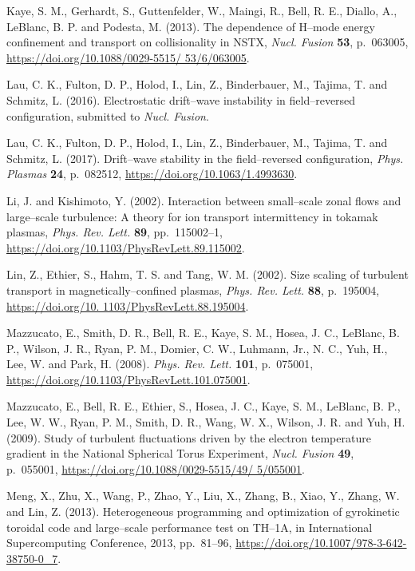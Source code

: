 \documentclass[a4paper,openany,12pt]{book}
\begin{document}
\begin{thebibliography}{100}
\bibitem{}
Kaye, S. M., Gerhardt, S., Guttenfelder, W., Maingi, R., Bell, R. E., Diallo, A., LeBlanc, B. P. and Podesta, M. (2013). The dependence of H--mode energy confinement and transport on collisionality in NSTX, \emph{Nucl. Fusion} 
\textbf{53}, p.~063005, \url{https://doi.org/10.1088/0029-5515/ 53/6/063005}.

\bibitem{}
Lau, C. K., Fulton, D. P., Holod, I., Lin, Z., Binderbauer, M., Tajima, T. and Schmitz, L. (2016).  Electrostatic drift--wave instability in field--reversed configuration, submitted to \emph{Nucl. Fusion}. 

\bibitem{}
Lau, C. K., Fulton, D. P., Holod, I., Lin, Z., Binderbauer, M., Tajima, T. and Schmitz, L. (2017). Drift--wave stability in the field--reversed configuration, \emph{Phys. Plasmas} \textbf{24}, p.~082512,
\url{https://doi.org/10.1063/1.4993630}.

\bibitem{}
Li, J. and Kishimoto, Y. (2002). Interaction between small--scale zonal flows and large--scale turbulence: A theory for ion transport intermittency in tokamak plasmas, \emph{Phys. Rev. Lett.} \textbf{89}, pp.~115002--1, 
\url{https://doi.org/10.1103/PhysRevLett.89.115002}.

\bibitem{}
Lin, Z., Ethier, S., Hahm, T. S. and Tang, W. M. (2002). Size scaling of turbulent transport in magnetically--confined plasmas, \emph{Phys. Rev. Lett.} \textbf{88}, p.~195004, \url{https://doi.org/10. 1103/PhysRevLett.88.195004}.

\bibitem{}
Mazzucato, E., Smith, D. R., Bell, R. E., Kaye, S. M., Hosea, J. C., LeBlanc, B. P., Wilson, J. R., Ryan, P. M., Domier, C. W., Luhmann, Jr., N. C., Yuh, H., Lee, W. and Park, H. (2008). \emph{Phys. Rev. Lett.} \textbf{101}, p.~075001, 
\url{https://doi.org/10.1103/PhysRevLett.101.075001}.

\bibitem{}
Mazzucato, E., Bell, R. E., Ethier, S., Hosea, J. C., Kaye, S. M., LeBlanc, B. P., Lee, W. W., Ryan, P. M., Smith, D. R., Wang, W. X., Wilson, J. R. and Yuh, H. (2009). Study of turbulent fluctuations driven by the electron temperature gradient in the National Spherical Torus Experiment, \emph{Nucl. Fusion} \textbf{49}, p.~055001, 
\url{https://doi.org/10.1088/0029-5515/49/ 5/055001}.

\bibitem{}
Meng, X., Zhu, X., Wang, P., Zhao, Y., Liu, X., Zhang, B., Xiao, Y., Zhang, W. and Lin, Z. (2013). Heterogeneous programming and optimization of gyrokinetic toroidal code and large--scale performance test on TH--1A, in International Supercomputing Conference, 2013, pp.~81--96, 
\url{https://doi.org/10.1007/978-3-642-38750-0_7}.


\end{thebibliography}
\end{document}
